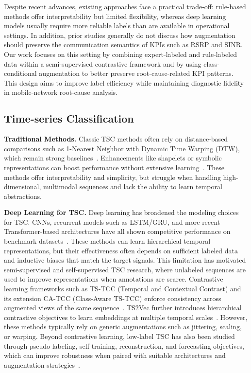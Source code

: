 \documentclass[lettersize,journal]{IEEEtran}
\begin{document}
Despite recent advances, existing approaches face a practical trade-off: rule-based methods offer interpretability but limited flexibility, whereas deep learning models usually require more reliable labels than are available in operational settings. In addition, prior studies generally do not discuss how augmentation should preserve the communication semantics of KPIs such as RSRP and SINR. Our work focuses on this setting by combining expert-labeled and rule-labeled data within a semi-supervised contrastive framework and by using class-conditional augmentation to better preserve root-cause-related KPI patterns. This design aims to improve label efficiency while maintaining diagnostic fidelity in mobile-network root-cause analysis.



\subsection{Time-series Classification}

\noindent\textbf{Traditional Methods.}  
Classic TSC methods often rely on distance-based comparisons such as 1-Nearest Neighbor with Dynamic Time Warping (DTW), which remain strong baselines~\cite{bagnall2017great}. Enhancements like shapelets or symbolic representations can boost performance without extensive learning~\cite{baydogan2015learning}. These methods offer interpretability and simplicity, but struggle when handling high-dimensional, multimodal sequences and lack the ability to learn temporal abstractions.

\noindent\textbf{Deep Learning for TSC.}  
Deep learning has broadened the modeling choices for TSC. CNNs, recurrent models such as LSTM/GRU, and more recent Transformer-based architectures have all shown competitive performance on benchmark datasets~\cite{ismail2019deep, ismail2020inceptiontime, fawaz2020deep}. These methods can learn hierarchical temporal representations, but their effectiveness often depends on sufficient labeled data and inductive biases that match the target signals. This limitation has motivated semi-supervised and self-supervised TSC research, where unlabeled sequences are used to improve representations when annotations are scarce. Contrastive learning frameworks such as TS-TCC (Temporal and Contextual Contrast) and its extension CA-TCC (Class-Aware TS-TCC) enforce consistency across augmented views of the same sequence~\cite{eldele2021time, eldele2023self}. TS2Vec further introduces hierarchical contrastive objectives to learn embeddings at multiple temporal scales~\cite{yue2022ts2vec}. However, these methods typically rely on generic augmentations such as jittering, scaling, or warping.
Beyond contrastive learning, low-label TSC has also been studied through pseudo-labeling, self-training, reconstruction, and forecasting objectives, which can improve robustness when paired with suitable architectures and augmentation strategies~\cite{eldele2023self}. 
\end{document}
